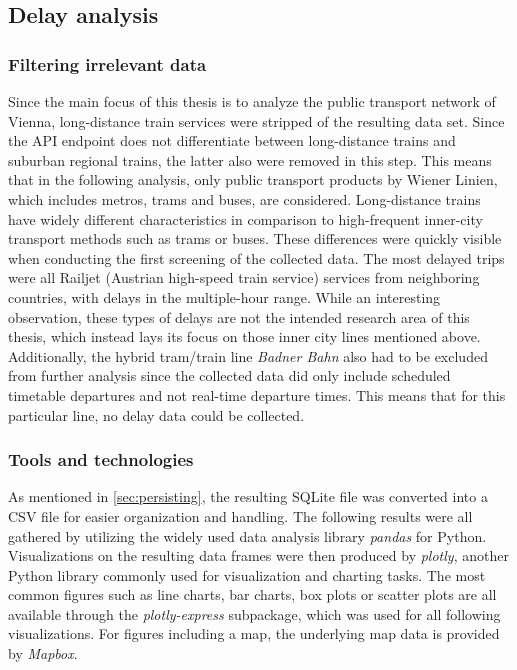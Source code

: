 \subsection{Delay analysis}
\label{sec:analysis}

\subsubsection{Filtering irrelevant data}

Since the main focus of this thesis is to analyze the public transport network of Vienna, long-distance train services were stripped of the resulting data set. Since the \ac{API} endpoint does not differentiate between long-distance trains and suburban regional trains, the latter also were removed in this step. This means that in the following analysis, only public transport products by Wiener Linien, which includes metros, trams and buses, are considered. Long-distance trains have widely different characteristics in comparison to high-frequent inner-city transport methods such as trams or buses. These differences were quickly visible when conducting the first screening of the collected data. The most delayed trips were all Railjet (Austrian high-speed train service) services from neighboring countries, with delays in the multiple-hour range. While an interesting observation, these types of delays are not the intended research area of this thesis, which instead lays its focus on those inner city lines mentioned above. Additionally, the hybrid tram/train line \textit{Badner Bahn} also had to be excluded from further analysis since the collected data did only include scheduled timetable departures and not real-time departure times. This means that for this particular line, no delay data could be collected.

\subsubsection{Tools and technologies}

As mentioned in \cref{sec:persisting}, the resulting SQLite file was converted into a \ac{CSV} file for easier organization and handling. The following results were all gathered by utilizing the widely used data analysis library \textit{pandas} for Python. Visualizations on the resulting data frames were then produced by \textit{plotly}, another Python library commonly used for visualization and charting tasks. The most common figures such as line charts, bar charts, box plots or scatter plots are all available through the \textit{plotly-express} subpackage, which was used for all following visualizations. For figures including a map, the underlying map data is provided by \textit{Mapbox}.

